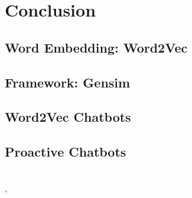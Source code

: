 \chapter{Conclusion}
\label{chap:conclusion}

\section{Word Embedding: Word2Vec}

\section{Framework: Gensim}

\section{Word2Vec Chatbots}

\section{Proactive Chatbots}



~\\[5cm]
\Locality, \Date
~\\[1cm]
\Author